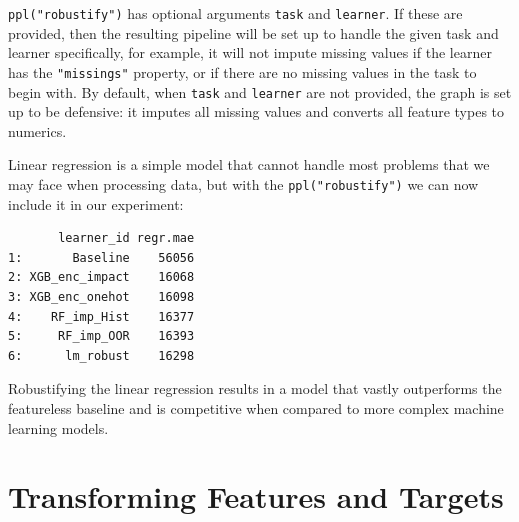 \texttt{ppl("robustify")} has optional arguments \texttt{task} and
\texttt{learner}. If these are provided, then the resulting pipeline
will be set up to handle the given task and learner specifically, for
example, it will not impute missing values if the learner has the
\texttt{"missings"} property, or if there are no missing values in the
task to begin with. By default, when \texttt{task} and \texttt{learner}
are not provided, the graph is set up to be defensive: it imputes all
missing values and converts all feature types to numerics.

Linear regression is a simple model that cannot handle most problems
that we may face when processing data, but with the
\texttt{ppl("robustify")} we can now include it in our experiment:

\begin{Shaded}
\begin{Highlighting}[]
\OtherTok{=} \NormalTok{(}\NormalTok{(}\NormalTok{) }\SpecialCharTok{\%\textgreater{}\textgreater{}\%} \NormalTok{(}\NormalTok{))}
\SpecialCharTok{$}\OtherTok{=} 

\OtherTok{=} \NormalTok{(}
\SpecialCharTok{$}
\SpecialCharTok{$}\NormalTok{(}
\end{Highlighting}
\end{Shaded}

\begin{verbatim}
       learner_id regr.mae
1:       Baseline    56056
2: XGB_enc_impact    16068
3: XGB_enc_onehot    16098
4:    RF_imp_Hist    16377
5:     RF_imp_OOR    16393
6:      lm_robust    16298
\end{verbatim}

Robustifying the linear regression results in a model that vastly
outperforms the featureless baseline and is competitive when compared to
more complex machine learning models.

\hypertarget{sec-prepro-scale}{%
\section{Transforming Features and Targets}\label{sec-prepro-scale}}

